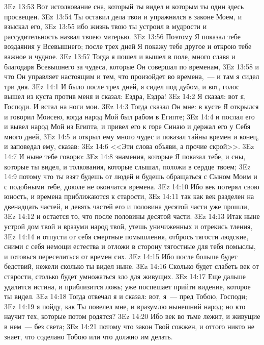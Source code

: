 \vs 3Ez 13:53 Вот истолкование сна, который ты видел и которым ты один здесь просвещен.
\vs 3Ez 13:54 Ты оставил дела твои и упражнялся в законе Моем, и взыскал его,
\vs 3Ez 13:55 ибо жизнь твою ты устроил в мудрости и рассудительность назвал твоею матерью.
\vs 3Ez 13:56 Поэтому Я показал тебе воздаяния у Всевышнего; после трех дней Я покажу тебе другое и открою тебе важное и чудное.
\vs 3Ez 13:57 Тогда я пошел и вышел в поле, много славя и благодаря Всевышнего за чудеса, которые Он совершал по временам,
\vs 3Ez 13:58 и что Он управляет настоящим и тем, что произойдет во времена,~--- и там я сидел три дня.
\vs 3Ez 14:1 И было после трех дней, я сидел под дубом, и вот, голос вышел из куста против меня и сказал: Ездра, Ездра!
\vs 3Ez 14:2 Я сказал: вот я, Господи. И встал на ноги мои.
\vs 3Ez 14:3 Тогда сказал Он мне: в кусте Я открылся и говорил Моисею, когда народ Мой был рабом в Египте;
\vs 3Ez 14:4 и послал его и вывел народ Мой из Египта, и привел его к горе Синаю и держал его у Себя много дней,
\vs 3Ez 14:5 и открыл ему много чудес и показал тайны времен и конец, и заповедал ему, сказав:
\vs 3Ez 14:6 <<Эти слова объяви, а прочие скрой>>.
\vs 3Ez 14:7 И ныне тебе говорю:
\vs 3Ez 14:8 знамения, которые Я показал тебе, и сны, которые ты видел, и толкования, которые слышал, положи в сердце твоем;
\vs 3Ez 14:9 потому что ты взят будешь от людей и будешь обращаться с Сыном Моим и с подобными тебе, доколе не окончатся времена.
\vs 3Ez 14:10 Ибо век потерял свою юность, и времена приближаются к старости,
\vs 3Ez 14:11 так как век разделен на двенадцать частей, и девять частей его и половина десятой части уже прошли,
\vs 3Ez 14:12 и остается то, что после половины десятой части.
\vs 3Ez 14:13 Итак ныне устрой дом твой и вразуми народ твой, утешь уничиженных и отрекись тления,
\vs 3Ez 14:14 и отпусти от себя смертные помышления, отбрось тягости людские, сними с себя немощи естества и отложи в сторону тягостные для тебя помыслы, и готовься переселиться от времен сих.
\vs 3Ez 14:15 Ибо после больше будет бедствий, нежели сколько ты видел ныне.
\vs 3Ez 14:16 Сколько будет слабеть век от старости, столько будет умножаться зло для живущих.
\vs 3Ez 14:17 Еще дальше удалится истина, и приблизится ложь; уже поспешает прийти видение, которое ты видел.
\vs 3Ez 14:18 Тогда отвечал я и сказал: вот, я~--- пред Тобою, Господи;
\vs 3Ez 14:19 я пойду, как Ты повелел мне, и вразумлю нынешний народ; но кто научит тех, которые потом родятся?
\vs 3Ez 14:20 Ибо век во тьме лежит, и живущие в нем~--- без света;
\vs 3Ez 14:21 потому что закон Твой сожжен, и оттого никто не знает, что соделано Тобою или что должно им делать.
